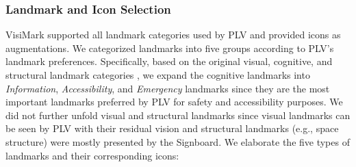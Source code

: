 \subsubsection{Landmark and Icon Selection}\label{Landmark selection}
VisiMark supported all landmark categories used by PLV and provided icons as augmentations. We categorized landmarks into five groups according to PLV's landmark preferences. Specifically, based on the original visual, cognitive, and structural landmark categories \cite{sorrows1999nature}, we expand the cognitive landmarks into \textit{Information}, \textit{Accessibility}, and \textit{Emergency} landmarks since they are the most important landmarks preferred by PLV for safety and accessibility purposes. We did not further unfold visual and structural landmarks since visual landmarks can be seen by PLV with their residual vision and structural landmarks (e.g., space structure) were mostly presented by the Signboard. %
We elaborate the five types of landmarks and their corresponding icons: 
